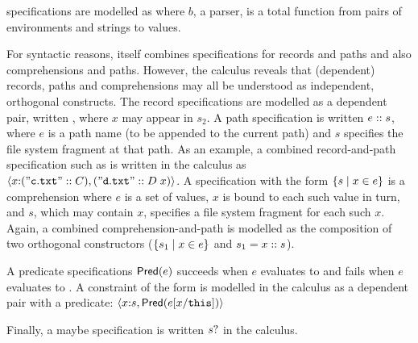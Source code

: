 \documentclass[nocopyrightspace,natbib]{sigplanconf}
\begin{document}
\padshaskell{} specifications are modelled as
 where $b$, a parser,  is a total
function from pairs of environments and strings to
values.  

For syntactic reasons, \forest{} itself combines specifications
for records and paths and also comprehensions and paths.
However, the calculus reveals that (dependent) records, paths 
and comprehensions
may all be understood as independent, orthogonal constructs.
The record specifications are modelled as a dependent pair,
written , where $x$ may appear in $s_2$.
A path specification is written $e \mathrel{::} s$, where $e$ is
a path name (to be appended to the current path) and 
$s$ specifies the file system fragment at that path.  As an example,
a combined \forest{} record-and-path specification such as
is written in the calculus as
$\langle x {:} (\mathtt{"c.txt"} \mathrel{::} C), (\mathtt{"d.txt"} \mathrel{::} D\; x) \rangle$.
A specification with the form $\{ s \mid x \in e \}$ is a comprehension where
$e$ is a set of values, $x$ is bound to each such value in turn, and
$s$, which may contain $x$, specifies a file system fragment for each
such $x$.  Again, a combined \forest{} comprehension-and-path
\cd{[x :: s | x <- e]} is modelled as the composition of two
orthogonal constructors ($\{ s_1 \mid x \in e \}$ and $s_1 = x \mathrel{::} s$).

A predicate specifications $\mathsf{Pred}(e)$ succeeds
when $e$ evaluates to \True{} and fails when $e$ evaluates
to \False.  A \forest{} constraint of the form 
is modelled in the calculus as a dependent pair with a predicate:
$\langle x {:} s, \mathsf{Pred}(e[x/\mathtt{this}]) \rangle$

Finally, a maybe specification is written $s?$ in the calculus.
 
\end{document}
